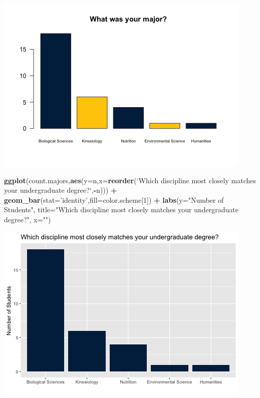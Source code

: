 \documentclass[]{article}
\newenvironment{Shaded}{\begin{snugshade}}{\end{snugshade}}
\newcommand{\KeywordTok}[1]{\textcolor[rgb]{0.13,0.29,0.53}{\textbf{#1}}}
\newcommand{\DataTypeTok}[1]{\textcolor[rgb]{0.13,0.29,0.53}{#1}}
\newcommand{\DecValTok}[1]{\textcolor[rgb]{0.00,0.00,0.81}{#1}}
\newcommand{\StringTok}[1]{\textcolor[rgb]{0.31,0.60,0.02}{#1}}
\newcommand{\OperatorTok}[1]{\textcolor[rgb]{0.81,0.36,0.00}{\textbf{#1}}}
\newcommand{\NormalTok}[1]{#1}
\begin{document}
\includegraphics{figures/majors-summary-1.png}

\begin{Shaded}
\begin{Highlighting}[]
\KeywordTok{ggplot}\NormalTok{(count.majors,}\KeywordTok{aes}\NormalTok{(}\DataTypeTok{y=}\NormalTok{n,}\DataTypeTok{x=}\KeywordTok{reorder}\NormalTok{(}\StringTok{`}\DataTypeTok{Which discipline most closely matches your undergraduate degree?}\StringTok{`}\NormalTok{,}\OperatorTok{-}\NormalTok{n))) }\OperatorTok{+}
\StringTok{         }\KeywordTok{geom_bar}\NormalTok{(}\DataTypeTok{stat=}\StringTok{'identity'}\NormalTok{,}\DataTypeTok{fill=}\NormalTok{color.scheme[}\DecValTok{1}\NormalTok{]) }\OperatorTok{+}
\StringTok{  }\KeywordTok{labs}\NormalTok{(}\DataTypeTok{y=}\StringTok{"Number of Students"}\NormalTok{,}
       \DataTypeTok{title=}\StringTok{"Which discipline most closely matches your undergraduate degree?"}\NormalTok{,}
       \DataTypeTok{x=}\StringTok{""}\NormalTok{)}
\end{Highlighting}
\end{Shaded}

\includegraphics{figures/majors-summary-2.png}
\end{document}
